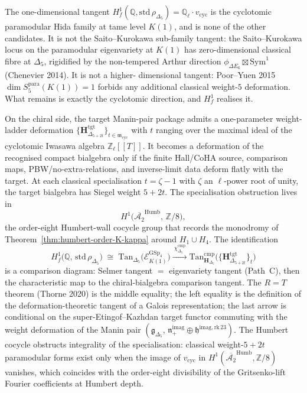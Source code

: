 \begin{remark}
\label{rem:hida-tangent-weight-ladder}
The one-dimensional tangent
$H^1_f(\mathbb{Q}, \mathrm{std}\,\rho_{\Delta_5}) = \mathbb{Q}_\ell\cdot v_{\mathrm{cyc}}$
is the cyclotomic paramodular Hida family at tame level $K(1)$, and is none of the
other candidates. It is not the Saito--Kurokawa sub-family tangent: the
Saito--Kurokawa locus on the paramodular eigenvariety at $K(1)$ has zero-dimensional
classical fibre at $\Delta_5$, rigidified by the non-tempered Arthur direction
$\phi_{\Delta E_6}\boxtimes\mathrm{Sym}^1$ (Chenevier 2014). It is not a higher-
dimensional tangent: Poor--Yuen 2015 $\dim S_5^{\mathrm{para}}(K(1)) = 1$ forbids any
additional classical weight-$5$ deformation. What remains is exactly the cyclotomic
direction, and $H^1_f$ realises it.

On the chiral side, the target Manin-pair package admits a one-parameter
weight-ladder deformation
\(\{\mathbf{H}^{\mathrm{tgt}}_{\Delta_{5+2t}}\}_{t\in\mathfrak{m}_{\mathrm{cyc}}}\)
with \(t\) ranging over the maximal ideal of the cyclotomic Iwasawa
algebra \(\mathbb{Z}_\ell[[T]]\).  It becomes a deformation of the
recognised compact bialgebra only if the finite Hall/CoHA source,
comparison maps, PBW/no-extra-relations, and inverse-limit data deform
flatly with the target. At each classical specialisation \(t=\zeta-1\)
with \(\zeta\) an \(\ell\)-power root of unity, the target bialgebra has
Siegel weight \(5+2t\). The specialisation obstruction lives in
\[
 H^1\!\bigl(\overline{\mathcal{A}_2}^{\mathrm{Humb}},\,\mathbb{Z}/8\bigr),
\]
the order-eight Humbert-wall cocycle group that records the monodromy of
Theorem~\ref{thm:humbert-order-K-kappa} around $H_1\cup H_4$. The identification
\[
 H^1_f\!\bigl(\mathbb{Q},\,\mathrm{std}\,\rho_{\Delta_5}\bigr)
 \;\cong\;
 \mathrm{Tan}_{\Delta_5}\!\bigl(\mathcal{E}^{\mathrm{GSp}_4}_{K(1)}\bigr)
 \xrightarrow{\ \chi^{\mathrm{cmp}}_{\Delta_5}\ }
 \mathrm{Tan}^{\mathrm{cmp}}_{\mathbf{H}_{\Delta_5}}\!\bigl(
 \{\mathbf{H}^{\mathrm{tgt}}_{\Delta_{5+2t}}\}_t\bigr)
\]
is a comparison diagram: Selmer tangent \(=\) eigenvariety tangent
(Path~C), then the characteristic map to the chiral-bialgebra comparison
tangent. The $R=T$ theorem (Thorne 2020) is the middle equality; the left
equality is the definition of the deformation-theoretic tangent of a
Galois representation; the last arrow is conditional on the
super-Etingof--Kazhdan target functor commuting with the weight deformation
of the Manin pair
$(\mathfrak{g}_{\Delta_5},\,\mathfrak{n}_+^{\mathrm{imag}}\oplus
\mathfrak{h}^{\mathrm{imag,rk\,23}})$. The Humbert cocycle obstructs integrality of
the specialisation: classical weight-$5+2t$ paramodular forms exist only when the
image of $v_{\mathrm{cyc}}$ in $H^1(\overline{\mathcal{A}_2}^{\mathrm{Humb}},
\mathbb{Z}/8)$ vanishes, which coincides with the order-eight divisibility of the
Gritsenko-lift Fourier coefficients at Humbert depth.
\end{remark}

